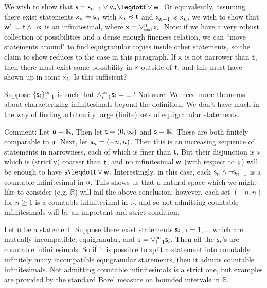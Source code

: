 \documentclass[11pt]{article}
\begin{document}
We wish to show that $\stmt = \stmt_{n-1}\OR\stmt[v]_n\finer \stmt[t]\OR \stmt[w]$. Or equivalently, assuming there exist statements $\stmt[x]_n\eqgran\stmt_n$ with $\stmt[x]_n\narrower\stmt[t]$ and $\stmt[x]_{n-1}\narrower\stmt[x]_n$, we wish to show that $\stmt[w]' := \stmt[t]\AND\NOT\stmt[x]$ is an infinitesimal, where $\stmt[x]=\OR_{i=1}^n\stmt[x]_i$. Note: if we have a very robust collection of possibilities and a dense enough fineness relation, we can ``move statements around" to find equigranular copies inside other statements, so the claim to show reduces to the case in this paragraph. If $\stmt[x]$ is not narrower than $\stmt[t]$, then there must exist some possibility in $\stmt[x]$ outside of $\stmt[t]$, and this must have shown up in some $\stmt[x]_i$. Is this sufficient? 

Suppose $\{\stmt_i\}_{i=1}^{\infty}$ is such that $\AND_{i=1}^{\infty}\stmt_i = \impossibility$? Not sure. We need more theorems about characterizing infinitesimals beyond the definition. We don't have much in the way of finding arbitrarily large (finite) sets of equigranular statements. 

Comment: Let $\stmt[u] = \mathbb{R}$. Then let $\stmt[t] = (0,\infty)$ and $\stmt = \mathbb{R}$. These are both finitely comparable to $\stmt[u]$. Next, let $\stmt_n = (-n,n)$. Then this is an increasing sequence of statements in narrowness, each of which is finer than $\stmt[t]$. But their disjunction is $\stmt$ which is (strictly) coarser than $\stmt[t]$, and no infinitesimal $\stmt[w]$ (with respect to $\stmt[u]$) will be enough to have $\stmt\finer\stmt[t]\OR \stmt[w]$. Interestingly, in this case, each $\stmt_n\AND\NOT\stmt_{n-1}$ is a countable infinitesimal in $\stmt[u]$. This shows us that a natural space which we might like to consider (e.g. $\mathbb{R}$) will fail the above conclusion; however, each set $(-n,n)$ for $n\geq1$ is a countable infinitesimal in $\mathbb{R}$, and so not admitting countable infinitesimals will be an important and strict condition. 

Let $\stmt[u]$ be a statement. Suppose there exist statements $\stmt_i$, $i=1,\ldots$ which are mutually incompatible, equigranular, and $\stmt[u] = \OR_{i=1}^{\infty}\stmt_i$. Then all the $\stmt_i$'s are countable infinitesimals. So if it is possible to split a statement into countably infinitely many incompatible equigranular statements, then it admits countable infinitesimals. Not admitting countable infinitesimals is a strict one, but examples are provided by the standard Borel measure on bounded intervals in $\mathbb{R}$. 
\end{document}
